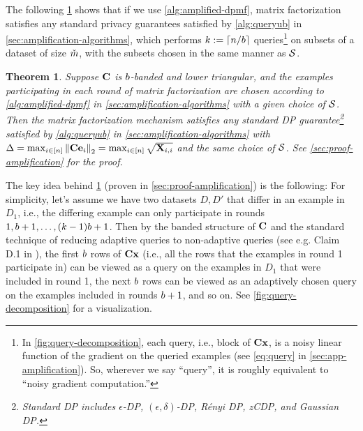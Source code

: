 \documentclass{article}
\newtheorem{theorem}{Theorem}
\begin{document}
The following \cref{thm:general-amplification} shows that if we use \cref{alg:amplified-dpmf}, matrix factorization satisfies any standard privacy guarantees satisfied by \cref{alg:queryub} in \cref{sec:amplification-algorithms}, which performs $k :=  \lceil n / b\rceil$ queries\footnote{In \cref{fig:query-decomposition}, each query, i.e., block of $\mathbf{C} \mathbf{x}$, is a noisy linear function of the gradient on the queried examples (see \cref{eq:query} in \cref{sec:app-amplification}). So, wherever we say ``query'', it is roughly equivalent to ``noisy gradient computation.''} on subsets of a dataset of size $\check{m}$, with the subsets chosen in the same manner as $\mathcal{S}$. 

\begin{theorem}\label{thm:general-amplification}
Suppose $\mathbf{C}$ is $b$-banded and lower triangular, and the examples participating in each round of matrix factorization are chosen according to \cref{alg:amplified-dpmf} in \cref{sec:amplification-algorithms} with a given choice of $\mathcal{S}$. Then the matrix factorization mechanism satisfies any standard DP guarantee\footnote{Standard DP includes $\epsilon$-DP, $(\epsilon,\delta)$-DP, R\'enyi DP, zCDP, and Gaussian DP.} satisfied by \cref{alg:queryub} in \cref{sec:amplification-algorithms} with $\Delta = \max_{i \in [n]} \left\|\mathbf{C} \mathbf{e}_i\right\|_2 = \max_{i \in [n]} \sqrt{\mathbf{X}_{i,i}}$ and the same choice of $\mathcal{S}$. See \cref{sec:proof-amplification} for the proof.
\end{theorem}

The key idea behind \cref{thm:general-amplification} (proven in \cref{sec:proof-amplification}) is the following: For simplicity, let's assume we have two datasets $D, D'$ that differ in an example in $D_1$, i.e., the differing example can only participate in rounds $1, b + 1, \ldots, (k-1)b + 1$. Then by the banded structure of $\mathbf{C}$ and the standard technique of reducing adaptive queries to non-adaptive queries (see e.g. Claim D.1 in \cite{denisov22matfact}), the first $b$ rows of $\mathbf{C} \mathbf{x}$ (i.e., all the rows that the examples in round 1 participate in) can be viewed as a query on the examples in $D_1$ that were included in round 1, the next $b$ rows can be viewed as an adaptively chosen query on the examples included in rounds $b + 1$, and so on. See \cref{fig:query-decomposition} for a visualization. 
\end{document}
